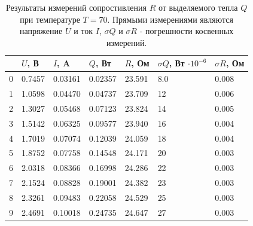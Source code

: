 \documentclass[12pt]{article}
\begin{document}
\begin{table}[H]
    \centering
    \begin{tabular}{|l|l|l|l|l|l|l|}
        \hline
          & $U$, В & $I$, A  & $Q$, Вт & $R$, Ом & $\sigma Q$, Вт $\cdot 10^{-6}$ & $\sigma R$, Ом \\
        \hline
        0 & 0.7457 & 0.03161 & 0.02357 & 23.591  & 8.0                            & 0.008          \\
        1 & 1.0598 & 0.04470 & 0.04737 & 23.709  & 12                             & 0.006          \\
        2 & 1.3027 & 0.05468 & 0.07123 & 23.824  & 14                             & 0.005          \\
        3 & 1.5142 & 0.06325 & 0.09577 & 23.940  & 16                             & 0.004          \\
        4 & 1.7019 & 0.07074 & 0.12039 & 24.059  & 18                             & 0.004          \\
        5 & 1.8752 & 0.07758 & 0.14548 & 24.171  & 20                             & 0.003          \\
        6 & 2.0318 & 0.08366 & 0.16998 & 24.286  & 22                             & 0.003          \\
        7 & 2.1524 & 0.08828 & 0.19001 & 24.382  & 23                             & 0.003          \\
        8 & 2.3261 & 0.09483 & 0.22058 & 24.529  & 25                             & 0.003          \\
        9 & 2.4691 & 0.10018 & 0.24735 & 24.647  & 27                             & 0.003          \\
        \hline
    \end{tabular}
    
    \caption{Результаты измерений сопростивления \(R\) от выделяемого тепла \(Q\) при температуре \(T = 70\)\textcelsius.
        Прямыми измерениями являются напряжение \(U\) и ток \(I\), \(\sigma Q\) и \(\sigma R\) - погрешности косвенных измерений.}
    \label{tab:6}
\end{table}
\end{document}
